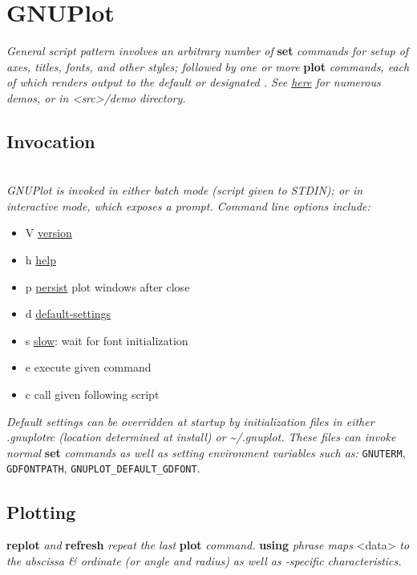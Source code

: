 \section{GNUPlot}
\textit{General script pattern involves an arbitrary number of }\textbf{set}\textit{ commands for setup of axes, titles, fonts, and other styles; followed by one or more }\textbf{plot}\textit{ commands, each of which renders output to the default or designated . See \href{http://gnuplot.info/demos/}{here} for numerous demos, or in <src>/demo directory.}


\subsection*{Invocation}
\\
\textit{GNUPlot is invoked in either batch mode (script given to STDIN); or in interactive mode, which exposes a prompt. Command line options include:}\
\begin{itemize}[label=-]
    \item V \quad \ul{version}
    \item h \quad \ul{help}
    \item p \quad \ul{persist} plot windows after close 
    \item d \quad \ul{default-settings}
    \item s \quad \ul{slow}: wait for font initialization
    \item e \quad execute given command
    \item c \quad call given following script
\end{itemize}
\textit{Default settings can be overridden at startup by initialization files in either .gnuplotrc (location determined at install) or \textasciitilde /.gnuplot. These files can invoke normal }\textbf{set}\textit{ commands as well as setting environment variables such as: } \texttt{GNUTERM}, \texttt{GDFONTPATH}, \texttt{GNUPLOT\_DEFAULT\_GDFONT}. \\


\subsection*{Plotting} 

\textbf{replot} \textit{ and }\textbf{refresh}\textit{ repeat the last }\textbf{plot}\textit{ command. }\textbf{using}\textit{ phrase maps }<data>\textit{ to the abscissa \& ordinate (or angle and radius) as well as -specific characteristics.}





